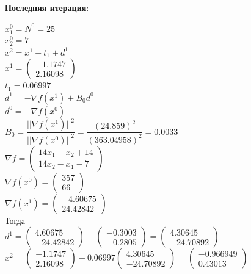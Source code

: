 \textbf{Последняя итерация}:

$x^{0}_{1} = N^{0} = 25$\\
$x^{0}_{2} = 7$\\
$x^{2} = x^{1} + t_{1} +d^{1}$\\
$
x^{1} = 
\begin{pmatrix}
  -1.1747\\
  2.16098
\end{pmatrix}
$\\
$t_{1} = 0.06997$\\
$d^{1} = -\nabla f(x^{1}) + B_{0}d^{0}$\\
$d^{0} = -\nabla f(x^{0})$\\
$B_{0} = \dfrac{||\nabla f(x^{1})||^{2}}{||\nabla f(x^{0})||^{2}} = \dfrac{(24.859)^{2}}{(363.04958)^{2}} = 0.0033$\\
$
\nabla f = 
\begin{pmatrix}
  14x_{1} - x_{2} + 14\\
  14x_{2} - x_{1} - 7
\end{pmatrix}
$\\
$
\nabla f(x^{0}) = 
\begin{pmatrix}
  357\\
  66
\end{pmatrix}
$\\
$
\nabla f(x^{1}) = 
\begin{pmatrix}
  -4.60675\\
  24.42842
\end{pmatrix}
$\\
Тогда\\
$
d^{1} = 
\begin{pmatrix}
  4.60675\\
  -24.42842
\end{pmatrix}
+
\begin{pmatrix}
  -0.3003\\
  -0.2805
\end{pmatrix}
=
\begin{pmatrix}
  4.30645\\
  -24.70892
\end{pmatrix}
$\\

$
x^{2} = 
\begin{pmatrix}
  -1.1747\\
  2.16098
\end{pmatrix}
+ 0.06997
\begin{pmatrix}
  4.30645\\
  -24.70892
\end{pmatrix}
=
\begin{pmatrix}
  -0.966949\\
   0.43013
\end{pmatrix}
$

\pagebreak
